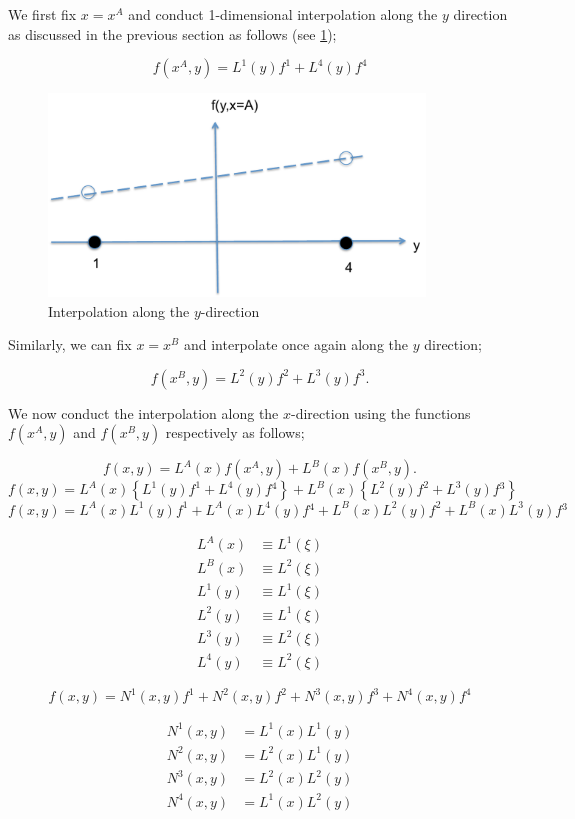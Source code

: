 We first fix $x = {x^A}$ and conduct 1-dimensional interpolation along the $y$ direction as discussed in the previous section as follows (see \cref{fig:onedimn});

\[f({x^A},y) = {L^1}(y){f^1} + {L^4}(y){f^4}\]

\begin{figure}[H]
\centering
\includegraphics[width=10cm]{inter1D.pdf}
\caption{Interpolation along the $y$-direction}
\label{fig:onedimn}
\end{figure}

Similarly, we can fix $x = {x^B}$ and interpolate once again along the $y$ direction;

\[f({x^B},y) = {L^2}(y){f^2} + {L^3}(y){f^3}.\]

We now conduct the interpolation along the $x$-direction using the functions $f({x^A},y)$ and $f({x^B},y)$ respectively as follows;

\[f(x,y) = {L^A}(x){f({x^A},y)} + {L^B}(x){f({x^B},y)}.\]
\[f(x,y) = {L^A}(x)\left\{ {{L^1}(y){f^1} + {L^4}(y)f{}^4} \right\} + {L^B}(x)\left\{ {{L^2}(y){f^2} + {L^3}(y)f{}^3} \right\}\]
\[f(x,y) = {L^A}(x){L^1}(y){f^1} + {L^A}(x){L^4}(y)f{}^4 + {L^B}(x){L^2}(y){f^2} + {L^B}(x){L^3}(y)f{}^3\]


\begin{align*}
{L^A}(x) & \equiv {L^1}(\xi ) \\
{L^B}(x) & \equiv {L^2}(\xi ) \\
{L^1}(y) & \equiv {L^1}(\xi ) \\
{L^2}(y) & \equiv {L^1}(\xi ) \\
{L^3}(y) & \equiv {L^2}(\xi ) \\
{L^4}(y) & \equiv {L^2}(\xi )
\end{align*}

\[f(x,y) = {N^1}(x,y){f^1} + {N^2}(x,y){f^2} + {N^3}(x,y){f^3} + {N^4}(x,y){f^4}\]

\begin{align*}
{N^1}(x,y) & = {L^1}(x){L^1}(y) \\
{N^2}(x,y) & = {L^2}(x){L^1}(y) \\
{N^3}(x,y) & = {L^2}(x){L^2}(y) \\
{N^4}(x,y) & = {L^1}(x){L^2}(y)
\end{align*}


